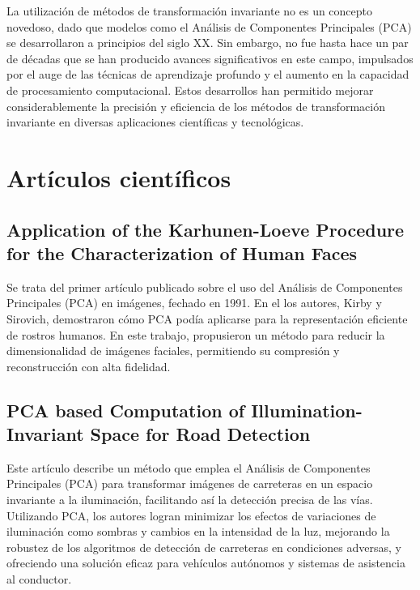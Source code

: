 
La utilización de métodos de transformación invariante no es un concepto novedoso, dado que modelos como el Análisis de Componentes Principales (PCA) se desarrollaron a principios del siglo XX. Sin embargo, no fue hasta hace un par de décadas que se han producido avances significativos en este campo, impulsados por el auge de las técnicas de aprendizaje profundo y el aumento en la capacidad de procesamiento computacional. Estos desarrollos han permitido mejorar considerablemente la precisión y eficiencia de los métodos de transformación invariante en diversas aplicaciones científicas y tecnológicas.

\section{Artículos científicos}\label{artículos-científicos}

\subsection{Application of the Karhunen-Loeve Procedure for the Characterization of Human Faces}\label{pca-1}

Se trata del primer artículo publicado sobre el uso del Análisis de Componentes Principales (PCA) en imágenes, fechado en 1991. En el los autores, Kirby y Sirovich, demostraron cómo PCA podía aplicarse para la representación eficiente de rostros humanos. En este trabajo, propusieron un método para reducir la dimensionalidad de imágenes faciales, permitiendo su compresión y reconstrucción con alta fidelidad.


\subsection{PCA based Computation of Illumination-Invariant Space for Road Detection}\label{pca-2}

Este artículo describe un método que emplea el Análisis de Componentes Principales (PCA) para transformar imágenes de carreteras en un espacio invariante a la iluminación, facilitando así la detección precisa de las vías. Utilizando PCA, los autores logran minimizar los efectos de variaciones de iluminación como sombras y cambios en la intensidad de la luz, mejorando la robustez de los algoritmos de detección de carreteras en condiciones adversas, y ofreciendo una solución eficaz para vehículos autónomos y sistemas de asistencia al conductor.

